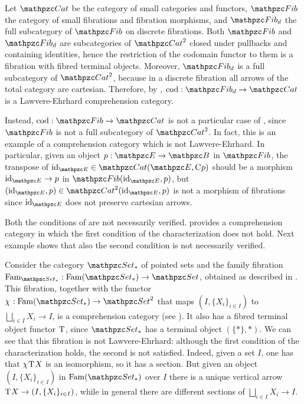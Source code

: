 \documentclass{lmcs} %
\theoremstyle{plain}\newtheorem{satz}[thm]{Satz} %
\begin{document}
			\begin{exa}
Let $\Cat$ be the category of small categories and functors, 
$\Fibone$ the category of small fibrations and fibration morphisms, and 
$\Fibdisc$ the full subcategory of $\Fibone$ on discrete fibrations. 
Both $\Fibone$ and $\Fibdisc$ are subcategories of $\Arr{\Cat}$ closed under pullbacks and containing identities, hence 
the restriction of the codomain functor to them is a fibration with fibred terminal objects. 
% 
Moreover, $\Fibdisc$ is a full subcategory of $\Arr{\Cat}$, because in a discrete fibration all arrows of the total category are cartesian. 
Therefore,  by , $\cod : \Fibdisc\to\Cat$ is a Lawvere-Ehrhard comprehension category. 

Instead, $\cod : \Fibone \to \Cat$ 
is not a particular case of , since 
$\Fibone$ is not a full subcategory of $\Arr{\Cat}$. 
In fact, this is an example of a comprehension category which is not Lawvere-Ehrhard. 
In particular, given an object $p:\ct{E}\to\ct{B}$ in $\Fibone$, 
the transpose of $\id{\ct{E}}\in\Hom{\Cat}(\ct{E},\comp{}p)$ should be a morphism $\id{\ct{E}}\to p$ in $\Hom{\Fibone}(\id{\ct{E}},p)$, 
but $(\id{\ct{E}},p)\in\Hom{\Arr{\Cat}}(\id{\ct{E}},p)$ is not a morphism of fibrations since $\id{\ct{E}}$ does not preserve cartesian arrows.
	
		\end{exa}
			
			Both the conditions of  are not necessarily verified.  provides a comprehension category in which the first condition of the characterization does not hold. Next example shows that also the second condition is not necessarily verified.
			
			\begin{exa}\label{ex:famsetp}
				Consider the category $\ctsetp$ of pointed sets and the family fibration $\Famfib{\ctsetp}:\Fam{\ctsetp}\to\ctset$, obtained as described in \cite[Definition 1.2.1]{jacobs1999categorical}. This fibration, together with the functor $\jcomp{}:\Fam{\ctsetp}\to\Arr{\ctset}$ that maps $(I,\{X_i\}_{i\in I})$ to $\bigsqcup_{i\in I}X_i\to I$, is a comprehension category (see \cite{jacobs1999categorical}). It also has a fibred terminal object functor $\mathrm{T}^{}$, since $\ctsetp$ has a terminal object $(\{*\}, *)$. We can see that this fibration is not Lawvere-Ehrhard: although the first condition of the characterization holds, the second is not satisfied. Indeed, given a set $I$, one has that $\chi^{}\mathrm{T}^{}X$ is an isomorphism, so it has a section. But given an object $(I,\{X_i\}_{i\in I})$ in $\Fam{\ctsetp}$ over $I$ there is a unique vertical arrow $\mathrm{T}^{}X\to (I,\{X_i\}_{i\in I})$, while in general there are different sections of $\bigsqcup_{i\in I}X_i\to I$. 
			\end{exa}
			
\end{document}

